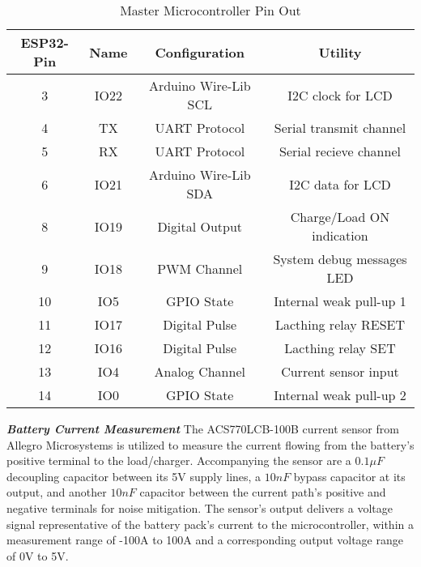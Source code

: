 \begin{table}[h]
    \centering
    \caption{Master Microcontroller Pin Out}
    \label{tab:ESP_PinOut}
    \begin{tabular}{|c|c|c|c|}
        \hline
        \textbf{ESP32-Pin} & \textbf{Name} & \textbf{Configuration} & \textbf{Utility} \\
        \hline
        \hline
        3 & IO22 & Arduino Wire-Lib SCL & I2C clock for LCD \\
        \hline
        4 & TX & UART Protocol & Serial transmit channel \\
        \hline
        5 & RX & UART Protocol & Serial recieve channel \\
        \hline
        6 & IO21 & Arduino Wire-Lib SDA & I2C data for LCD \\
        \hline
        8 & IO19 & Digital Output & Charge/Load ON indication \\
        \hline
        9 & IO18 & PWM Channel & System debug messages LED \\
        \hline
        10 & IO5 & GPIO State & Internal weak pull-up 1 \\
        \hline
        11 & IO17 & Digital Pulse & Lacthing relay RESET \\
        \hline
        12 & IO16 & Digital Pulse & Lacthing relay SET \\
        \hline
        13 & IO4 & Analog Channel & Current sensor input \\
        \hline
        14 & IO0 & GPIO State & Internal weak pull-up 2 \\
        \hline
    \end{tabular}
\end{table}
\newpage
\noindent
\textbf{\emph{Battery Current Measurement}}\label{subsubsec:cur_sen_design}\newline
\noindent
The ACS770LCB-100B current sensor from Allegro Microsystems \cite{currentSensori} is utilized to measure the current flowing from the battery's positive terminal to the load/charger. Accompanying the sensor are a $0.1 \mu F$ decoupling capacitor between its 5V supply lines, a $10 nF$ bypass capacitor at its output, and another $10 nF$ capacitor between the current path's positive and negative terminals for noise mitigation. The sensor's output delivers a voltage signal representative of the battery pack's current to the microcontroller, within a measurement range of -100A to 100A and a corresponding output voltage range of 0V to 5V.\newline\newline
